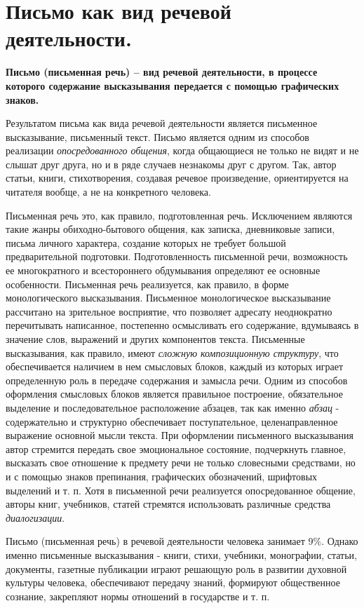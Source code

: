 \section{Письмо как вид речевой деятельности.}


\textbf{Письмо (письменная речь) -- вид речевой деятельности, в процессе которого содержание высказывания передается с помощью графических знаков.} 

Результатом письма как вида речевой деятельности является письменное высказывание, письменный текст. 
Письмо является одним из способов реализации \textit{опосредованного общения}, когда общающиеся не только не видят и не слышат друг друга, но и в ряде случаев незнакомы друг с другом. 
Так, автор статьи, книги, стихотворения, создавая речевое произведение, ориентируется на читателя вообще, а не на конкретного человека. 

Письменная речь это, как правило, подготовленная речь. Исключением являются такие жанры обиходно-бытового общения, как записка, дневниковые записи, письма личного характера, создание которых не требует большой предварительной подготовки. Подготовленность письменной речи, возможность ее многократного и всестороннего обдумывания определяют ее основные особенности.
Письменная речь реализуется, как правило, в форме монологического высказывания. 
Письменное монологическое высказывание рассчитано на зрительное восприятие, что позволяет адресату неоднократно перечитывать написанное, постепенно осмысливать его содержание, вдумываясь в значение слов, выражений и других компонентов текста.
Письменные высказывания, как правило, имеют \textit{сложную композиционную структуру}, что обеспечивается наличием в нем смысловых блоков, каждый из которых играет определенную роль в передаче содержания и замысла речи. 
Одним из способов оформления смысловых блоков является правильное построение, обязательное выделение и последовательное расположение абзацев, так как именно \textit{абзац} - содержательно и структурно обеспечивает поступательное, целенаправленное выражение основной мысли текста.
При оформлении письменного высказывания автор стремится передать свое эмоциональное состояние, подчеркнуть главное, высказать свое отношение к предмету речи не только словесными средствами, но и с помощью знаков препинания, графических обозначений, шрифтовых выделений и т. п.
Хотя в письменной речи реализуется опосредованное общение, авторы книг, учебников, статей стремятся использовать различные средства \textit{диалогизации}.

Письмо (письменная речь) в речевой деятельности человека занимает $9\%$. 
Однако именно письменные высказывания - книги, стихи, учебники, монографии, статьи, документы, газетные публикации играют решающую роль в развитии духовной культуры человека, обеспечивают передачу знаний, формируют общественное сознание, закрепляют нормы отношений в государстве и т. п.